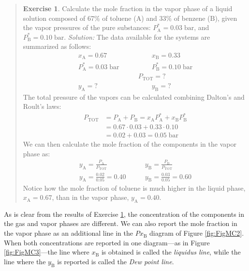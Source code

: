 \documentclass[
  9pt,
]{extbook}
\theoremstyle{definition}
\theoremstyle{definition}
\theoremstyle{definition}
\newtheorem{exercise}{Exercise}[chapter]
\theoremstyle{definition}
\theoremstyle{remark}
\begin{document}
\begin{quote}
\begin{exercise}
\protect\hypertarget{exr:xaya}{}\label{exr:xaya}Calculate the mole fraction in the vapor phase of a liquid solution composed of 67\% of toluene (\(\mathrm{A}\)) and 33\% of benzene (\(\mathrm{B}\)), given the vapor pressures of the pure substances: \(P_{\text{A}}^*=0.03\;\text{bar}\), and \(P_{\text{B}}^*=0.10\;\text{bar}\).
\emph{Solution:} The data available for the systems are summarized as follows:
\begin{equation}
\begin{aligned}
x_{\text{A}}=0.67  \qquad & \qquad x_{\text{B}}=0.33 \\
P_{\text{A}}^* = 0.03\;\text{bar} \qquad & \qquad P_{\text{B}}^* = 0.10\;\text{bar} \\
& P_{\text{TOT}} = ? \\
y_{\text{A}}=? \qquad & \qquad y_{\text{B}}=?
\end{aligned}
\label{eq:mc2}
\end{equation}
The total pressure of the vapors can be calculated combining Dalton's and Roult's laws:
\begin{equation}
\begin{aligned}
P_{\text{TOT}} &= P_{\text{A}}+P_{\text{B}}=x_{\text{A}} P_{\text{A}}^* + x_{\text{B}} P_{\text{B}}^* \\
&= 0.67\cdot 0.03+0.33\cdot 0.10 \\
&= 0.02 + 0.03 = 0.05 \;\text{bar}
\end{aligned}
\label{eq:mc3}
\end{equation}
We can then calculate the mole fraction of the components in the vapor phase as:
\begin{equation}
\begin{aligned}
y_{\text{A}}=\frac{P_{\text{A}}}{P_{\text{TOT}}} & \qquad y_{\text{B}}=\frac{P_{\text{B}}}{P_{\text{TOT}}} \\
y_{\text{A}}=\frac{0.02}{0.05}=0.40 & \qquad y_{\text{B}}=\frac{0.03}{0.05}=0.60
\end{aligned}
\label{eq:mc4}
\end{equation}
Notice how the mole fraction of toluene is much higher in the liquid phase, \(x_{\text{A}}=0.67\), than in the vapor phase, \(y_{\text{A}}=0.40\).
\end{exercise}
\end{quote}

As is clear from the results of Exercise \ref{exr:xaya}, the concentration of the components in the gas and vapor phases are different. We can also report the mole fraction in the vapor phase as an additional line in the \(Px_{\text{B}}\) diagram of Figure \ref{fig:FigMC2}. When both concentrations are reported in one diagram---as in Figure \ref{fig:FigMC3}---the line where \(x_{\text{B}}\) is obtained is called the \emph{liquidus line}, while the line where the \(y_{\text{B}}\) is reported is called the \emph{Dew point line}.
\end{document}
